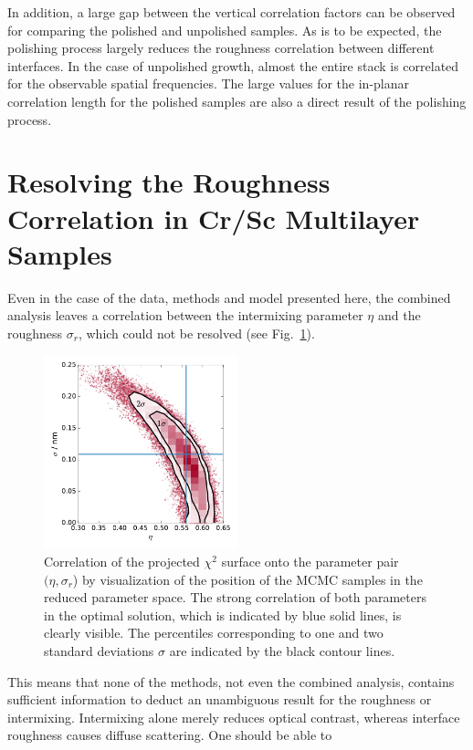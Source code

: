 In addition, a large gap between the vertical correlation factors can be observed for comparing the polished and unpolished samples. As is to be expected, the polishing process largely reduces the roughness correlation between different interfaces. In the case of unpolished growth, almost the entire stack is correlated for the observable spatial frequencies. The large values for the in-planar correlation length for the polished samples are also a direct result of the polishing process. 


\section{Resolving the Roughness Correlation in Cr/Sc Multilayer Samples} \label{ch_diff:sec_CrSc}
Even in the case of the data, methods and model presented here, the combined 
analysis leaves a correlation between the intermixing parameter $\eta$ and the 
roughness $\sigma_r$, which could not be resolved (see 
Fig.~\ref{fig:eta_sigma_correlation}).
\begin{figure}[htbp]
  \centering
  \includegraphics[width=0.5\textwidth]{images/eta_sigma_correlation}
  \caption{Correlation of the projected $\chi^2$ surface onto the parameter 
pair $(\eta, \sigma_r$) by visualization of the position of the MCMC samples in 
the reduced parameter space. The strong correlation of both parameters in the 
optimal solution, which is indicated by blue solid lines, is clearly visible. 
The percentiles corresponding to one and two standard deviations $\sigma$ are 
indicated by the black contour lines.}
  \label{fig:eta_sigma_correlation}
\end{figure}
This means that none of the methods, not even the combined analysis, contains 
sufficient information to deduct an unambiguous result for the roughness or 
intermixing. Intermixing alone merely reduces optical contrast, whereas 
interface roughness causes diffuse scattering. One should be able to 

